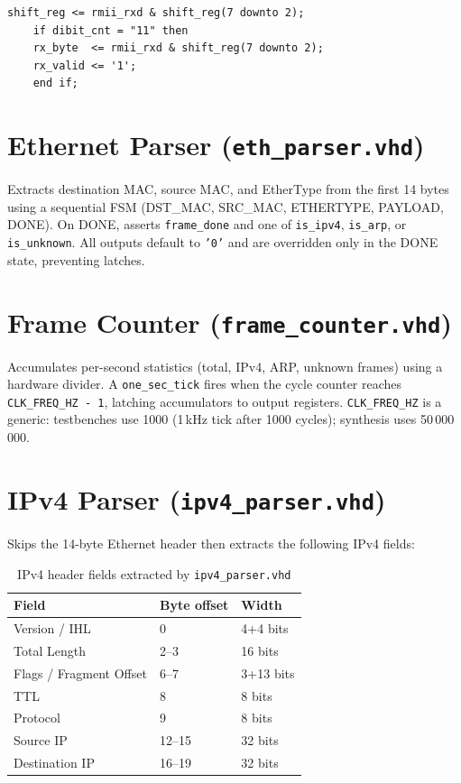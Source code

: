 \begin{lstlisting}[caption={Dibit assembly in \texttt{rmii\_rx.vhd}}]
	shift_reg <= rmii_rxd & shift_reg(7 downto 2);
	if dibit_cnt = "11" then
	rx_byte  <= rmii_rxd & shift_reg(7 downto 2);
	rx_valid <= '1';
	end if;
\end{lstlisting}

\section{Ethernet Parser (\texttt{eth\_parser.vhd})}
Extracts destination MAC, source MAC, and EtherType from the first 14 bytes using a sequential FSM (DST\_MAC, SRC\_MAC, ETHERTYPE, PAYLOAD, DONE). On DONE, asserts \texttt{frame\_done} and one of \texttt{is\_ipv4}, \texttt{is\_arp}, or \texttt{is\_unknown}. All outputs default to \texttt{'0'} and are overridden only in the DONE state, preventing latches.

\section{Frame Counter (\texttt{frame\_counter.vhd})}
Accumulates per-second statistics (total, IPv4, ARP, unknown frames) using a hardware divider. A \texttt{one\_sec\_tick} fires when the cycle counter reaches \texttt{CLK\_FREQ\_HZ - 1}, latching accumulators to output registers. \texttt{CLK\_FREQ\_HZ} is a generic: testbenches use 1000 (1\,kHz tick after 1000 cycles); synthesis uses 50\,000\,000.

\section{IPv4 Parser (\texttt{ipv4\_parser.vhd})}
Skips the 14-byte Ethernet header then extracts the following IPv4 fields:

\begin{table}[H]
	\centering
	\caption{IPv4 header fields extracted by \texttt{ipv4\_parser.vhd}}
	\begin{tabular}{lll}
		\toprule
		\textbf{Field} & \textbf{Byte offset} & \textbf{Width} \\
		\midrule
		Version / IHL            & 0      & 4+4 bits  \\
		Total Length             & 2--3   & 16 bits   \\
		Flags / Fragment Offset  & 6--7   & 3+13 bits \\
		TTL                      & 8      & 8 bits    \\
		Protocol                 & 9      & 8 bits    \\
		Source IP                & 12--15 & 32 bits   \\
		Destination IP           & 16--19 & 32 bits   \\
		\bottomrule
	\end{tabular}
	\label{tab:ipv4fields}
\end{table}

